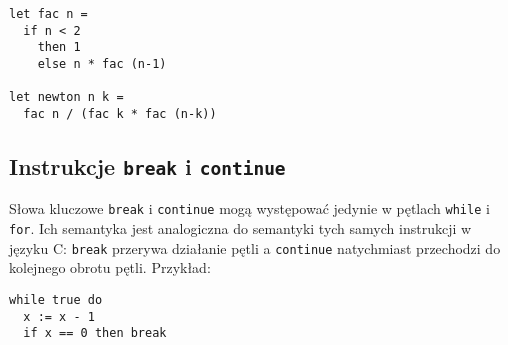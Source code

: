 \documentclass{documentation}
\begin{document}
\begin{verbatim}
let fac n =
  if n < 2
    then 1
    else n * fac (n-1)

let newton n k =
  fac n / (fac k * fac (n-k))
\end{verbatim}

\subsection{Instrukcje \texttt{break} i \texttt{continue}}
Słowa kluczowe \texttt{break} i \texttt{continue} mogą występować jedynie w pętlach
\texttt{while} i \texttt{for}. Ich semantyka jest analogiczna do semantyki tych samych
instrukcji w języku \textsc{C}: \texttt{break} przerywa działanie pętli a \texttt{continue}
natychmiast przechodzi do kolejnego obrotu pętli. Przykład:

\begin{verbatim}
while true do
  x := x - 1
  if x == 0 then break
\end{verbatim}
\end{document}
